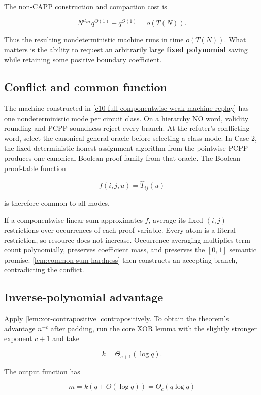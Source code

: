 \documentclass[11pt,letterpaper]{article}
\newcommand{\cref}[1]{\ref{#1}}
\let\Cref\cref
\theoremstyle{definition}
\theoremstyle{remark}
\begin{document}
The non-CAPP construction and compaction cost is

\[
N^{d_{\mathrm{ver}}}q^{O(1)}+q^{O(1)}=o(T(N)).
\]

Thus the resulting nondeterministic machine runs in time \(o(T(N))\).
What matters is the ability to request an arbitrarily large
\textbf{fixed polynomial} saving
while retaining some positive boundary coefficient.

\subsection{Conflict and common
function}\label{c4-conflict-and-common-function}

The machine constructed in
\cref{c10-full-componentwise-weak-machine-replay} has one nondeterministic
mode per circuit class. On a hierarchy NO word, validity rounding and PCPP
soundness reject every branch. At the refuter's
conflicting word, select the canonical general oracle before selecting a
class mode. In Case 2, the fixed deterministic honest-assignment
algorithm from the pointwise PCPP produces one canonical Boolean proof
family from that oracle. The Boolean proof-table function

\[
f(i,j,u)=\widehat T_{ij}(u)
\]

is therefore common to all modes.

If a componentwise linear sum approximates \(f\), average its
fixed-\((i,j)\) restrictions over occurrences of each proof variable.
Every atom is a literal restriction, so resource does not increase.
Occurrence averaging multiplies term count polynomially, preserves
coefficient mass, and preserves the \([0,1]\) semantic promise.
\Cref{lem:common-sum-hardness} then constructs an accepting branch,
contradicting the conflict.

\subsection{Inverse-polynomial
advantage}\label{c5-inverse-polynomial-advantage}

Apply \cref{lem:xor-contrapositive} contrapositively. To obtain the
theorem's advantage \(n^{-c}\) after padding, run the
core XOR lemma with the slightly stronger exponent \(c+1\) and take

\[
k=\Theta_{c+1}(\log q).
\]

The output function has

\[
m=k(q+O(\log q))=\Theta_c(q\log q)
\]
\end{document}
